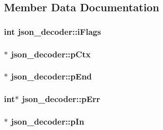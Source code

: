 \subsection{Member Data Documentation}
\hypertarget{structjson__decoder_a592ff18698cc277797bff869f68b5f52}{
\subsubsection[{i\-Flags}]{\setlength{\rightskip}{0pt plus 5cm}int json\-\_\-decoder\-::i\-Flags}}\label{dd/d82/structjson__decoder_a592ff18698cc277797bff869f68b5f52}
\hypertarget{structjson__decoder_a53557ea947ad365f6392faf0ed44e142}{
\subsubsection[{p\-Ctx}]{$\ast$ json\-\_\-decoder\-::p\-Ctx}}\label{dd/d82/structjson__decoder_a53557ea947ad365f6392faf0ed44e142}
\hypertarget{structjson__decoder_aea2cd518ac21b28213cb52e1ce8e2ce8}{
\subsubsection[{p\-End}]{$\ast$ json\-\_\-decoder\-::p\-End}}\label{dd/d82/structjson__decoder_aea2cd518ac21b28213cb52e1ce8e2ce8}
\hypertarget{structjson__decoder_ad170065903ab041a5d4e1f1f7671b728}{
\subsubsection[{p\-Err}]{\setlength{\rightskip}{0pt plus 5cm}int$\ast$ json\-\_\-decoder\-::p\-Err}}\label{dd/d82/structjson__decoder_ad170065903ab041a5d4e1f1f7671b728}
\hypertarget{structjson__decoder_a90a728942bc68c77fca12d3b17b8bf0d}{
\subsubsection[{p\-In}]{$\ast$ json\-\_\-decoder\-::p\-In}}\label{dd/d82/structjson__decoder_a90a728942bc68c77fca12d3b17b8bf0d}
